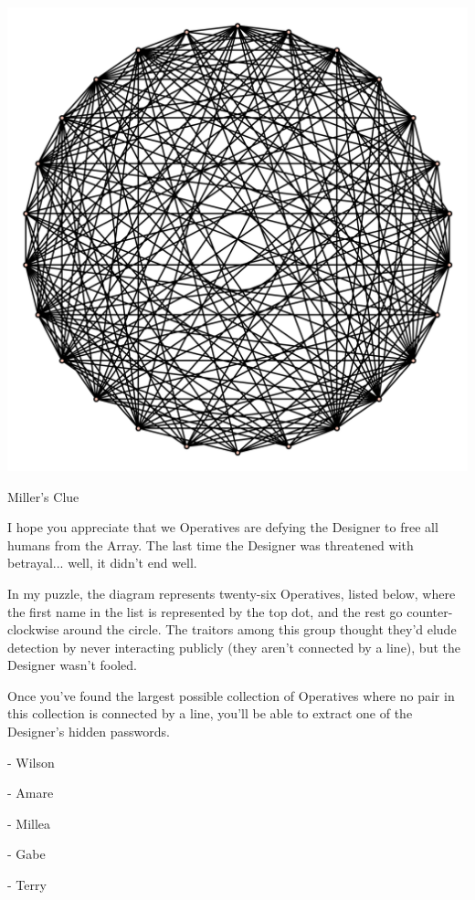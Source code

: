 \documentclass{article}
\begin{document}
\begin{center}
\includegraphics[width=\linewidth]{IndependentSet26.png}
\end{center}

\newpage

Miller's Clue

I hope you appreciate that we Operatives are defying
the Designer to free all humans from the Array. The last
time the Designer was threatened with betrayal... well,
it didn't end well.

In my puzzle, the diagram represents twenty-six Operatives,
listed below, where the first name in the list is represented
by the top dot, and
the rest go counter-clockwise around the circle.
The traitors among this group thought they'd elude detection
by never interacting publicly (they aren't connected by a line),
but the Designer wasn't fooled.

Once you've found the largest possible collection of Operatives where
no pair in this collection is connected by a line, you'll
be able to extract one of the Designer's hidden passwords.


- Wilson

- Amare

- Millea

- Gabe

- Terry
\end{document}
